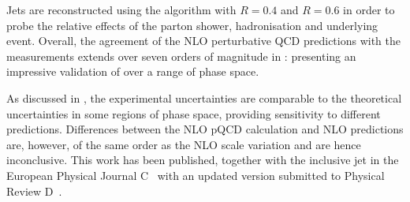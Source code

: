 Jets are reconstructed using the \akt algorithm with $R=0.4$ and $R=0.6$ in
order to probe the relative effects of the parton shower, hadronisation and
underlying event. Overall, the agreement of the NLO perturbative QCD predictions
with the measurements extends over seven orders of magnitude in \xs: presenting an impressive validation of \QCD
over a range of phase space.

As discussed in , the experimental
uncertainties are comparable to the theoretical uncertainties in some regions of
phase space, providing sensitivity to different predictions. Differences between
the NLO pQCD calculation and NLO \MC predictions are, however, of the same order
as the NLO scale variation and are hence inconclusive. This work has been
published, together with the inclusive jet  in the European Physical
Journal C~\cite{EPJC:2011:ATLASInclusiveJets} with an updated version submitted
to Physical Review D~\cite{CERN-PH-EP-2011-192}.
